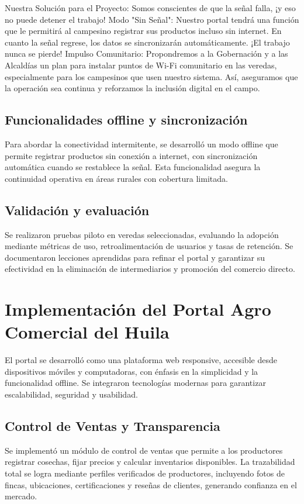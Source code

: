 Nuestra Solución para el Proyecto: Somos conscientes de que la señal falla, ¡y eso no puede detener el trabajo! Modo "Sin Señal": Nuestro portal tendrá una función que le permitirá al campesino registrar sus productos incluso sin internet. En cuanto la señal regrese, los datos se sincronizarán automáticamente. ¡El trabajo nunca se pierde! Impulso Comunitario: Propondremos a la Gobernación y a las Alcaldías un plan para instalar puntos de Wi-Fi comunitario en las veredas, especialmente para los campesinos que usen nuestro sistema. Así, aseguramos que la operación sea continua y reforzamos la inclusión digital en el campo.

\subsection{Funcionalidades offline y sincronización}
Para abordar la conectividad intermitente, se desarrolló un modo offline que permite registrar productos sin conexión a internet, con sincronización automática cuando se restablece la señal. Esta funcionalidad asegura la continuidad operativa en áreas rurales con cobertura limitada.

\subsection{Validación y evaluación}
Se realizaron pruebas piloto en veredas seleccionadas, evaluando la adopción mediante métricas de uso, retroalimentación de usuarios y tasas de retención. Se documentaron lecciones aprendidas para refinar el portal y garantizar su efectividad en la eliminación de intermediarios y promoción del comercio directo.

\section{Implementación del Portal Agro Comercial del Huila}

El portal se desarrolló como una plataforma web responsive, accesible desde dispositivos móviles y computadoras, con énfasis en la simplicidad y la funcionalidad offline. Se integraron tecnologías modernas para garantizar escalabilidad, seguridad y usabilidad.

\subsection{Control de Ventas y Transparencia}
Se implementó un módulo de control de ventas que permite a los productores registrar cosechas, fijar precios y calcular inventarios disponibles. La trazabilidad total se logra mediante perfiles verificados de productores, incluyendo fotos de fincas, ubicaciones, certificaciones y reseñas de clientes, generando confianza en el mercado.

